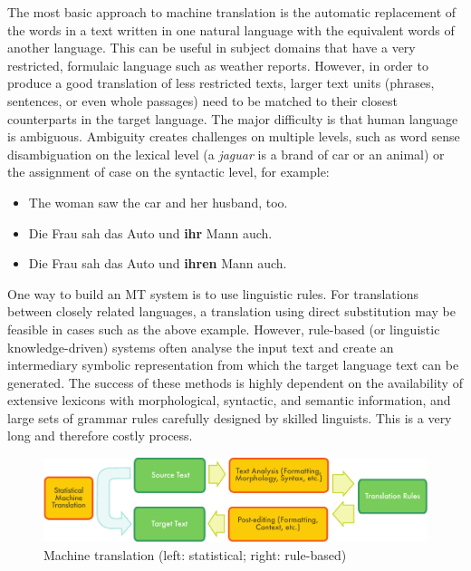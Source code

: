 \documentclass[]{../../metanetpaper}
\begin{document}
\begin{multicols}{2}

The most basic approach to machine translation is the automatic replacement of the words in a text written in one natural language with the equivalent words of another language. This can be useful in subject domains that have a very restricted, formulaic language such as weather reports.  However, in order to produce a good translation of less restricted texts, larger text units (phrases, sentences, or even whole passages) need to be matched to their closest counterparts in the target language. The major difficulty is that human language is ambiguous. Ambiguity creates challenges on multiple levels, such as word sense disambiguation on the lexical level (a \textit{jaguar} is a brand of car or an animal) or the assignment of case on the syntactic level, for example:

\begin{itemize}
\item[] The woman saw the car and her husband, too.
\item Die Frau sah das Auto und \textbf{ihr} Mann auch.
\item Die Frau sah das Auto und \textbf{ihren} Mann auch.
\end{itemize}

One way to build an MT system is to use linguistic rules. For translations between closely related languages, a translation using direct substitution may be feasible in cases such as the above example. However, rule-based (or linguistic knowledge-driven) systems often analyse the input text and create an intermediary symbolic representation from which the target language text can be generated. The success of these methods is highly dependent on the availability of extensive lexicons with morphological, syntactic, and semantic information, and large sets of grammar rules carefully designed by skilled linguists. This is a very long and therefore costly process.

\begin{figure}[htb]
  \center
  \includegraphics[width=\textwidth]{../_media/english/machine_translation}
  \caption{Machine translation (left: statistical; right: rule-based)}
  \label{fig:mtarch_en}
\end{figure}
 

\end{multicols}
\end{document}
